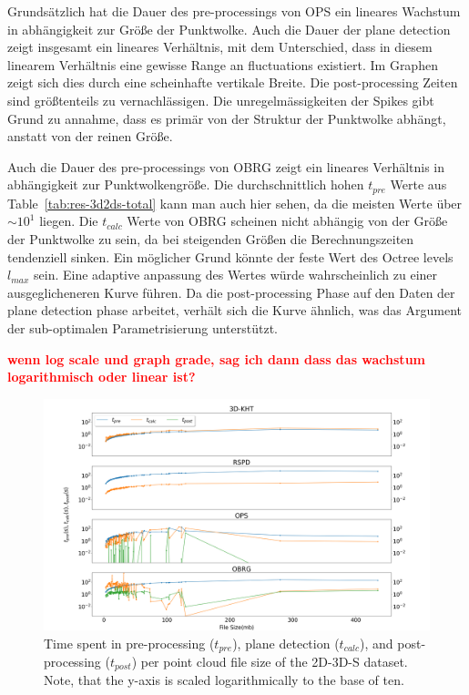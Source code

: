 \documentclass[main.tex]{subfiles}
\begin{document}
Grundsätzlich hat die Dauer des pre-processings von OPS ein lineares Wachstum in abhängigkeit zur Größe 
der Punktwolke. Auch die Dauer der plane detection zeigt insgesamt ein lineares Verhältnis, mit dem Unterschied,
dass in diesem linearem Verhältnis eine gewisse Range an fluctuations existiert. Im Graphen zeigt sich dies
durch eine scheinhafte vertikale Breite. Die post-processing Zeiten sind größtenteils zu vernachlässigen. 
Die unregelmässigkeiten der Spikes gibt Grund zu annahme, dass es primär von der Struktur der Punktwolke 
abhängt, anstatt von der reinen Größe. 

Auch die Dauer des pre-processings von OBRG zeigt ein lineares Verhältnis in abhängigkeit zur Punktwolkengröße.
Die durchschnittlich hohen $t_{pre}$ Werte aus Table~\ref{tab:res-3d2ds-total} kann man auch hier sehen, 
da die meisten Werte über ${\sim}10^1$ liegen.
Die $t_{calc}$ Werte von OBRG scheinen nicht abhängig von der Größe der Punktwolke zu sein, da bei steigenden
Größen die Berechnungszeiten tendenziell sinken. Ein möglicher Grund könnte der feste Wert des Octree levels
$l_{max}$ sein. Eine adaptive anpassung des Wertes würde wahrscheinlich zu einer ausgeglicheneren Kurve führen.
Da die post-processing Phase auf den Daten der plane detection phase arbeitet, verhält sich die Kurve ähnlich,
was das Argument der sub-optimalen Parametrisierung unterstützt.

\textbf{\textcolor{red}{wenn log scale und graph grade, sag ich dann dass das wachstum logarithmisch oder linear ist?}}


\begin{figure}[H]
    \centering
    \includegraphics[width=\textwidth]{images/SDsizetime.png}
    \caption[Time per Cloud size 2D-3D-S]{Time spent in pre-processing ($t_{pre}$), plane detection ($t_{calc}$),
        and post-processing ($t_{post}$) per point cloud file size of the 2D-3D-S dataset. Note, that the y-axis is
        scaled logarithmically to the base of ten.}
    \label{fig:sizetimestanford}
\end{figure}
\end{document}
